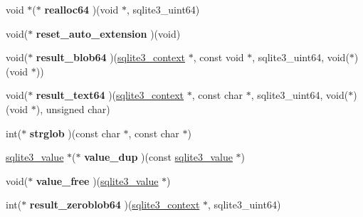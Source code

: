 \begin{DoxyCompactItemize}
\item 
void $\ast$($\ast$ {\bfseries realloc64} )(void $\ast$, sqlite3\+\_\+uint64)\hypertarget{structsqlite3__api__routines_a70ff502fb988ab59ef938e1d490ee421}{}\label{structsqlite3__api__routines_a70ff502fb988ab59ef938e1d490ee421}

\item 
void($\ast$ {\bfseries reset\+\_\+auto\+\_\+extension} )(void)\hypertarget{structsqlite3__api__routines_a4b6b665952a3dfdf31bc6dc227353617}{}\label{structsqlite3__api__routines_a4b6b665952a3dfdf31bc6dc227353617}

\item 
void($\ast$ {\bfseries result\+\_\+blob64} )(\hyperlink{structsqlite3__context}{sqlite3\+\_\+context} $\ast$, const void $\ast$, sqlite3\+\_\+uint64, void($\ast$)(void $\ast$))\hypertarget{structsqlite3__api__routines_a1a122d054b1085e09d7c99db0fbf33d7}{}\label{structsqlite3__api__routines_a1a122d054b1085e09d7c99db0fbf33d7}

\item 
void($\ast$ {\bfseries result\+\_\+text64} )(\hyperlink{structsqlite3__context}{sqlite3\+\_\+context} $\ast$, const char $\ast$, sqlite3\+\_\+uint64, void($\ast$)(void $\ast$), unsigned char)\hypertarget{structsqlite3__api__routines_aa731fddf6223075f2c988a61db715908}{}\label{structsqlite3__api__routines_aa731fddf6223075f2c988a61db715908}

\item 
int($\ast$ {\bfseries strglob} )(const char $\ast$, const char $\ast$)\hypertarget{structsqlite3__api__routines_a5768d018c3bc78c1e7017aa350473891}{}\label{structsqlite3__api__routines_a5768d018c3bc78c1e7017aa350473891}

\item 
\hyperlink{structMem}{sqlite3\+\_\+value} $\ast$($\ast$ {\bfseries value\+\_\+dup} )(const \hyperlink{structMem}{sqlite3\+\_\+value} $\ast$)\hypertarget{structsqlite3__api__routines_a0e8f3a6285721d5bd5defacc40036b34}{}\label{structsqlite3__api__routines_a0e8f3a6285721d5bd5defacc40036b34}

\item 
void($\ast$ {\bfseries value\+\_\+free} )(\hyperlink{structMem}{sqlite3\+\_\+value} $\ast$)\hypertarget{structsqlite3__api__routines_ae6b17c54a3fdcd73f8152ac1cb12b1af}{}\label{structsqlite3__api__routines_ae6b17c54a3fdcd73f8152ac1cb12b1af}

\item 
int($\ast$ {\bfseries result\+\_\+zeroblob64} )(\hyperlink{structsqlite3__context}{sqlite3\+\_\+context} $\ast$, sqlite3\+\_\+uint64)\hypertarget{structsqlite3__api__routines_adfdaba542143d957923791ed43097971}{}\label{structsqlite3__api__routines_adfdaba542143d957923791ed43097971}


\end{DoxyCompactItemize}
